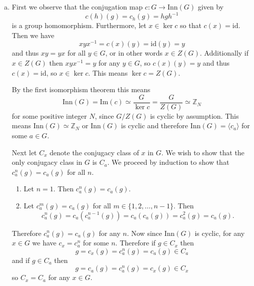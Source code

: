 \documentclass{article}
\begin{document}
\begin{Answer}
\begin{enumerate}[(a)]
  \item{
    First we observe that the conjugation map 
    $c : G \to \mathrm{Inn}(G)$ given by 
    $$
    c(h)(g) = c_h(g) = h g h^{-1}
    $$
    is a group homomorphism.
    Furthermore, let $x \in \ker c$ so that
    $c(x) = \mathrm{id}$.
    Then we have
    $$
    x y x^{-1} = c(x)(y) = \mathrm{id}(y) = y
    $$
    and thus $x y = y x$ for all $y \in G$, or in other words $x \in
    Z(G)$. Additionally if $x \in Z(G)$ then $xyx^{-1} = y$ for any 
    $y \in G$, so $c(x)(y) = y$ and thus $c(x) = \mathrm{id}$, so
    $x \in \ker c$. This means $\ker c = Z(G)$.

    By the first isomorphism theorem this means
    $$
    \mathrm{Inn}(G) 
  = \mathrm{Im}(c) 
  \simeq \frac{G}{\ker c}
  = \frac{G}{Z(G)}
  \simeq \mathbb{Z}_N
    $$
    for some positive integer $N$, since $G / Z(G)$ is cyclic by
    assumption. This means $\mathrm{Inn}(G) \simeq \mathbb{Z}_N$ or
    $\mathrm{Inn}(G)$ is cyclic and therefore 
    $\mathrm{Inn}(G) = \langle c_a \rangle$ for some $a \in G$.

    Next let $C_x$ denote the conjugacy class of $x$ in $G$.
    We wish to show that the only conjugacy class in $G$
    is $C_a$. We proceed by induction to show that 
    $c_a^n(g) = c_a(g)$ for all $n$.
    \begin{enumerate}
      \item{
        Let $n = 1$. Then $c_a^n(g) = c_a(g)$.
      }
      \item{
        Let $c_a^m(g) = c_a(g)$ for all 
        $m \in \{ 1, 2, \dots, n-1 \}$. Then
        $$
        c_a^n(g) = c_a(c_a^{n-1}(g)) = c_a(c_a(g)) = c_a^2(g) = c_a(g).
        $$
      }        
    \end{enumerate}
    Therefore $c_a^n(g) = c_a(g)$ for any $n$. Now since
    $\mathrm{Inn}(G)$ is cyclic, for any $x \in G$ we have 
    $c_x = c_a^n$ for some $n$. Therefore if $g \in C_x$ then
    $$
    g = c_x(g) = c_a^n(g) = c_a(g) \in C_a
    $$
    and if $g \in C_a$ then
    $$
    g = c_a(g) = c_a^n(g) = c_x(g) \in C_x
    $$
    so $C_x = C_a$ for any $x \in G$.

}
\end{enumerate}
\end{Answer}
\end{document}

